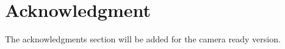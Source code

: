 \documentclass[conference]{IEEEtran}
\begin{document}
\section*{Acknowledgment}
The acknowledgments section will be added for the camera ready version. 







%
%
%







\end{document}
